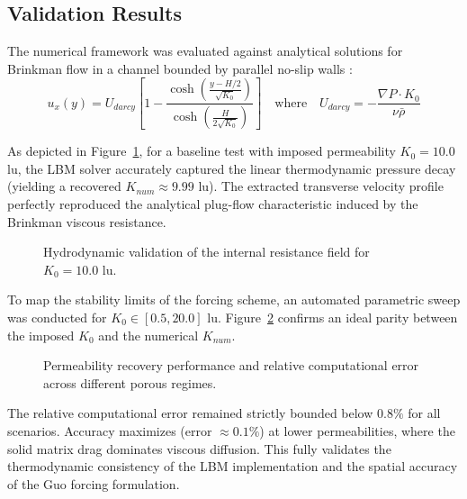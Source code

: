 \subsection{Validation Results}
The numerical framework was evaluated against analytical solutions for Brinkman flow in a channel bounded by parallel no-slip walls \cite{brinkman1949calculation}:
\begin{equation}
    u_x(y) = U_{darcy} \left[ 1 - \frac{\cosh\left(\frac{y - H/2}{\sqrt{K_0}}\right)}{\cosh\left(\frac{H}{2\sqrt{K_0}}\right)} \right] \quad \text{where} \quad U_{darcy} = -\frac{\nabla P \cdot K_0}{\nu \bar{\rho}}
\end{equation}

As depicted in Figure~\ref{fig:darcy_profile}, for a baseline test with imposed permeability $K_0 = 10.0$ lu, the LBM solver accurately captured the linear thermodynamic pressure decay (yielding a recovered $K_{num} \approx 9.99$ lu).
The extracted transverse velocity profile perfectly reproduced the analytical plug-flow characteristic induced by the Brinkman viscous resistance.

\begin{figure}[h!]
    \centering
    \caption{Hydrodynamic validation of the internal resistance field for $K_0 = 10.0$ lu.}
    \label{fig:darcy_profile}
\end{figure}

To map the stability limits of the forcing scheme, an automated parametric sweep was conducted for $K_0 \in [0.5, 20.0]$ lu.
Figure~\ref{fig:darcy_error} confirms an ideal parity between the imposed $K_0$ and the numerical $K_{num}$.

\begin{figure}[h!]
    \centering
    \caption{Permeability recovery performance and relative computational error across different porous regimes.}
    \label{fig:darcy_error}
\end{figure}

The relative computational error remained strictly bounded below $0.8\%$ for all scenarios.
Accuracy maximizes (error $\approx 0.1\%$) at lower permeabilities, where the solid matrix drag dominates viscous diffusion.
This fully validates the thermodynamic consistency of the LBM implementation and the spatial accuracy of the Guo forcing formulation.